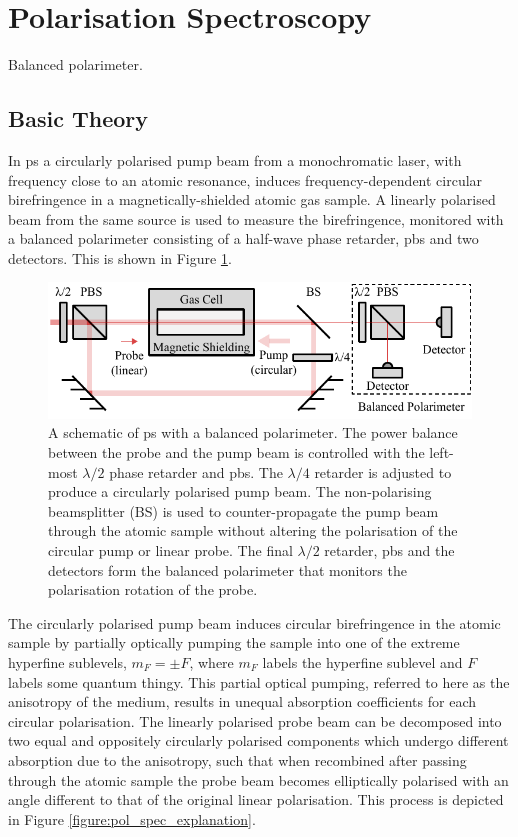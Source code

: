 \section{Polarisation Spectroscopy}\label{chapter:pol_spec}

{\color{red}
Balanced polarimeter.\cite{pearman_polarization_2002,yoshikawa_frequency_2003}
}

\subsection{Basic Theory}\label{section:pol_spec_theory}

In \gls{ps} a circularly polarised pump beam from a monochromatic laser, with frequency close to an atomic resonance, induces frequency-dependent circular birefringence in a magnetically-shielded atomic gas sample.
A linearly polarised beam from the same source is used to measure the birefringence, monitored with a balanced polarimeter consisting of a half-wave phase retarder, \gls{pbs} and two detectors.
This is shown in Figure \ref{figure:pol_spec_schematic}.

\begin{figure}
\centering
\includegraphics[width=\linewidth]{part1/Figs/PolSpecSchematic.pdf}
\caption{A schematic of \gls{ps} with a balanced polarimeter.
The power balance between the probe and the pump beam is controlled with the left-most $\lambda/2$ phase retarder and \gls{pbs}.
The $\lambda/4$ retarder is adjusted to produce a circularly polarised pump beam.
The non-polarising beamsplitter (BS) is used to counter-propagate the pump beam through the atomic sample without altering the polarisation of the circular pump or linear probe.
The final $\lambda/2$ retarder, \gls{pbs} and the detectors form the balanced polarimeter that monitors the polarisation rotation of the probe.}
\label{figure:pol_spec_schematic}
\end{figure}

The circularly polarised pump beam induces circular birefringence in the atomic sample by partially optically pumping the sample into one of the extreme hyperfine sublevels, $m_F=\pm F$, where $m_F$ labels the hyperfine sublevel and $F$ labels {\color{red}some quantum thingy.}
This partial optical pumping, referred to here as the anisotropy of the medium, results in unequal absorption coefficients for each circular polarisation.
The linearly polarised probe beam can be decomposed into two equal and oppositely circularly polarised components which undergo different absorption due to the anisotropy, such that when recombined after passing through the atomic sample the probe beam becomes elliptically polarised with an angle different to that of the original linear polarisation.
This process is depicted in Figure \ref{figure:pol_spec_explanation}.


